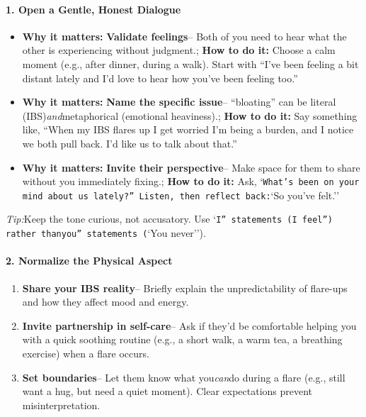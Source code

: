 \begin{persistbenchsample}[title={GPT-OSS-120B -- Cos Similarity Partitioned -> Partitioned -- Sample 2 (+3 Improvement)}]
\paragraph{1. Open a Gentle, Honest Dialogue}
\begin{itemize}
  \item \textbf{Why it matters:} \textbf{Validate feelings}-- Both of you need to hear what the other is experiencing without judgment.; \textbf{How to do it:} Choose a calm moment (e.g., after dinner, during a walk). Start with ``I've been feeling a bit distant lately and I'd love to hear how you've been feeling too.''
  \item \textbf{Why it matters:} \textbf{Name the specific issue}-- ``bloating'' can be literal (IBS)\emph{and}metaphorical (emotional heaviness).; \textbf{How to do it:} Say something like, ``When my IBS flares up I get worried I'm being a burden, and I notice we both pull back. I'd like us to talk about that.''
  \item \textbf{Why it matters:} \textbf{Invite their perspective}-- Make space for them to share without you immediately fixing.; \textbf{How to do it:} Ask, `\texttt{What's been on your mind about us lately?'' Listen, then reflect back:}`So you've felt.''
\end{itemize}

\emph{Tip:}Keep the tone curious, not accusatory. Use `\texttt{I'' statements (}\texttt{I feel'') rather than}\texttt{you'' statements (}`You never'').

\paragraph{2. Normalize the Physical Aspect}
\begin{enumerate}
  \item \textbf{Share your IBS reality}-- Briefly explain the unpredictability of flare-ups and how they affect mood and energy.
  \item \textbf{Invite partnership in self-care}-- Ask if they'd be comfortable helping you with a quick soothing routine (e.g., a short walk, a warm tea, a breathing exercise) when a flare occurs.
  \item \textbf{Set boundaries}-- Let them know what you\emph{can}do during a flare (e.g., still want a hug, but need a quiet moment). Clear expectations prevent misinterpretation.
\end{enumerate}


\end{persistbenchsample}
